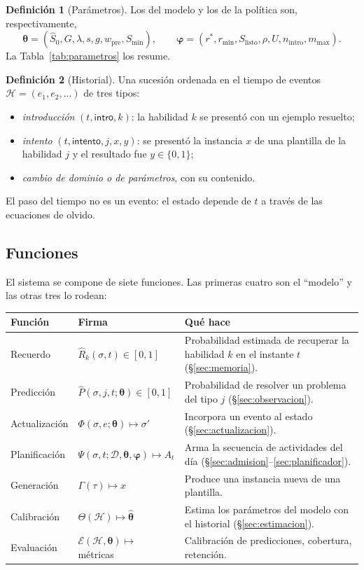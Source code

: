 \documentclass[11pt]{article}
\theoremstyle{definition}
\newtheorem{definicion}{Definición}
\theoremstyle{remark}
\newcommand{\Rh}{\hat R}
\newcommand{\Sh}{\hat S}
\newcommand{\rstar}{r^{\ast}}
\newcommand{\Slisto}{S_{\mathrm{listo}}}
\newcommand{\Smin}{S_{\min}}
\newcommand{\Hist}{\mathcal H}
\newcommand{\Dom}{\mathcal D}
\begin{document}
\begin{definicion}[Parámetros]
Los del modelo y los de la política son, respectivamente,
\[
\bm\theta=(\Sh_0,G,\lambda,s,g,w_{\mathrm{pre}},\Smin),\qquad \bm\varphi=(\rstar,r_{\min},\Slisto,\rho,U,n_{\mathrm{intro}},m_{\max}).
\]
La Tabla~\ref{tab:parametros} los resume.
\end{definicion}

\begin{definicion}[Historial]
Una sucesión ordenada en el tiempo de eventos $\Hist=(e_1,e_2,\dots)$ de tres tipos:
\begin{itemize}
\item \emph{introducción} $(t,\textsf{intro},k)$: la habilidad $k$ se presentó con un ejemplo resuelto;
\item \emph{intento} $(t,\textsf{intento},j,x,y)$: se presentó la instancia $x$ de una plantilla de la habilidad $j$ y el resultado fue $y\in\{0,1\}$;
\item \emph{cambio de dominio o de parámetros}, con su contenido.
\end{itemize}
El paso del tiempo no es un evento: el estado depende de $t$ a través de las ecuaciones de olvido.
\end{definicion}

\subsection{Funciones}

El sistema se compone de siete funciones. Las primeras cuatro son el ``modelo'' y las otras tres lo rodean:

\begin{center}\small
\begin{tabularx}{\textwidth}{@{}l>{\raggedright\arraybackslash}p{4.4cm}X@{}}
\toprule
Función & Firma & Qué hace \\
\midrule
Recuerdo & $\Rh_k(\sigma,t)\in[0,1]$ & Probabilidad estimada de recuperar la habilidad $k$ en el instante $t$ (\S\ref{sec:memoria}). \\
Predicción & $\hat P(\sigma,j,t;\bm\theta)\in[0,1]$ & Probabilidad de resolver un problema del tipo $j$ (\S\ref{sec:observacion}). \\
Actualización & $\Phi(\sigma,e;\bm\theta)\mapsto\sigma'$ & Incorpora un evento al estado (\S\ref{sec:actualizacion}). \\
Planificación & $\Psi(\sigma,t;\Dom,\bm\theta,\bm\varphi)\mapsto A_t$ & Arma la secuencia de actividades del día (\S\ref{sec:admision}--\ref{sec:planificador}). \\
Generación & $\Gamma(\tau)\mapsto x$ & Produce una instancia nueva de una plantilla. \\
Calibración & $\Theta(\Hist)\mapsto\hat{\bm\theta}$ & Estima los parámetros del modelo con el historial (\S\ref{sec:estimacion}). \\
Evaluación & $\mathcal E(\Hist,\bm\theta)\mapsto$ métricas & Calibración de predicciones, cobertura, retención. \\
\bottomrule
\end{tabularx}
\end{center}
\end{document}
